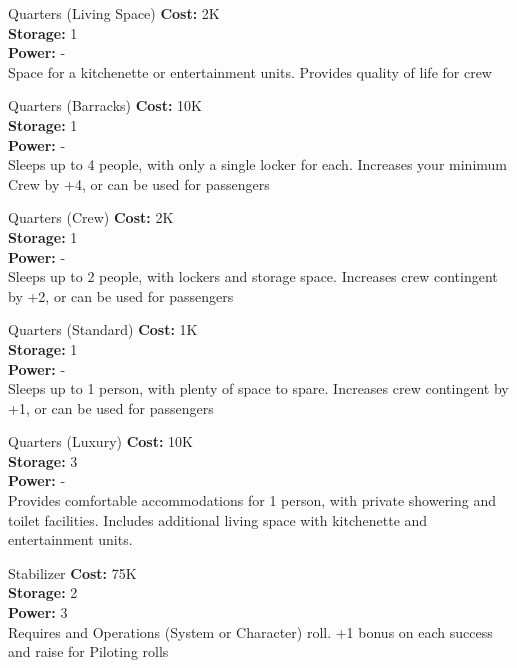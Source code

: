 \begin{multicols}{2}
\begin{genericsection}{Quarters (Living Space)}
\textbf{Cost:} 2K\\
\textbf{Storage:} 1\\
\textbf{Power:} -\\
Space for a kitchenette or entertainment units. Provides quality of life for crew
\end{genericsection}

\begin{genericsection}{Quarters (Barracks)}
\textbf{Cost:} 10K\\
\textbf{Storage:} 1\\
\textbf{Power:} -\\
Sleeps up to 4 people, with only a single locker for each. Increases your minimum Crew by +4, or can be used for passengers
\end{genericsection}

\begin{genericsection}{Quarters (Crew)}
\textbf{Cost:} 2K\\
\textbf{Storage:} 1\\
\textbf{Power:} -\\
Sleeps up to 2 people, with lockers and storage space. Increases crew contingent by +2, or can be used for passengers
\end{genericsection}

\begin{genericsection}{Quarters (Standard)}
\textbf{Cost:} 1K\\
\textbf{Storage:} 1\\
\textbf{Power:} -\\
Sleeps up to 1 person, with plenty of space to spare. Increases crew contingent by +1, or can be used for passengers
\end{genericsection}

\begin{genericsection}{Quarters (Luxury)}
\textbf{Cost:} 10K\\
\textbf{Storage:} 3\\
\textbf{Power:} -\\
Provides comfortable accommodations for 1 person, with private showering and toilet facilities. Includes additional living space with kitchenette and entertainment units.
\end{genericsection}

\begin{genericsection}{Stabilizer}
\textbf{Cost:} 75K\\
\textbf{Storage:} 2\\
\textbf{Power:} 3\\
Requires and Operations (System or Character) roll. +1 bonus on each success and raise for Piloting rolls
\end{genericsection}


\end{multicols}
